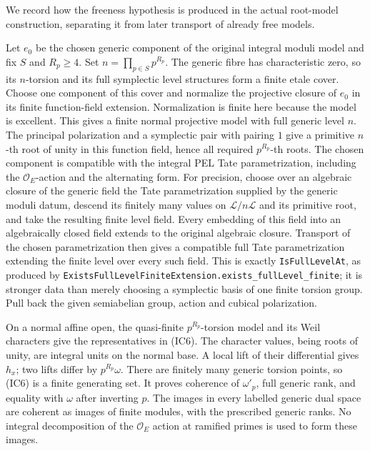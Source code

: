 We record how the freeness hypothesis is produced in the
actual root-model construction, separating it from later
transport of already free models.

Let \(e_0\) be the chosen generic component of the original
integral moduli model and fix \(S\) and \(R_p\ge4\).
Set \(n=\prod_{p\in S}p^{R_p}\).
The generic fibre has characteristic zero, so its
\(n\)-torsion and its full symplectic level structures
form a finite etale cover.
Choose one component of this cover and normalize the
projective closure of \(e_0\) in its finite function-field
extension. Normalization is finite here because the
model is excellent. This gives a finite normal
projective model with full generic level \(n\).
The principal polarization and a symplectic pair with
pairing \(1\) give a primitive \(n\)-th root of unity
in this function field, hence all required
\(p^{R_p}\)-th roots.
The chosen component is compatible with the integral
PEL Tate parametrization, including the
\(\mathcal O_E\)-action and the alternating form.
For precision, choose over an algebraic closure of
the generic field the Tate parametrization supplied
by the generic moduli datum, descend its finitely many
values on \(\mathcal L/n\mathcal L\) and its primitive
root, and take the resulting finite level field.
Every embedding of this field into an algebraically
closed field extends to the original algebraic
closure. Transport of the chosen parametrization
then gives a compatible full Tate parametrization
extending the finite level over every such field.
This is exactly
\texttt{IsFullLevelAt}, as produced by
\texttt{ExistsFullLevelFiniteExtension.exists\_fullLevel\_finite};
it is stronger data than merely choosing a
symplectic basis of one finite torsion group.
Pull back the given semiabelian group, action and
cubical polarization.

On a normal affine open, the quasi-finite
\(p^{R_p}\)-torsion model and its Weil characters
give the representatives in (IC6).
The character values, being roots of unity, are
integral units on the normal base.
A local lift of their differential gives \(h_x\);
two lifts differ by \(p^{R_p}\omega\).
There are finitely many generic torsion points,
so (IC6) is a finite generating set.
It proves coherence of \(\omega'_p\), full generic
rank, and equality with \(\omega\) after inverting \(p\).
The images in every labelled generic dual space
are coherent as images of finite modules, with
the prescribed generic ranks.
No integral decomposition of the \(\mathcal O_E\)
action at ramified primes is used to form these
images.

